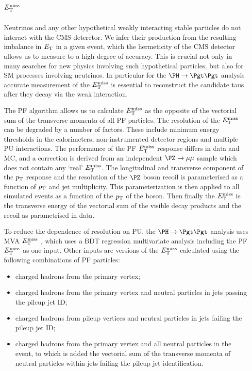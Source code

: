\section{$E_{\mathrm{T}}^{\text{miss}}$}
\label{sec:met}

Neutrinos and any other hypothetical weakly interacting stable particles do not
interact with the CMS deterctor. We infer their production from the resulting
imbalance in $E_{\mathrm{T}}$ in a given event, which the hermeticity of the CMS detector
allows us to measure to a high degree of accuracy. This is crucial not only in
many searches for new physics involving such hypothetical particles, but also for
\ac{SM} processes involving neutrinos. In particular for the $\PH \to \Pgt\Pgt$
analysis accurate measurement of the $E_{\mathrm{T}}^{\text{miss}}$ is essential to reconstruct the
candidate taus after they decay via the weak interaction.

The \ac{PF} algorithm allows us to calculate $E_{\mathrm{T}}^{\text{miss}}$ as the opposite of the vectorial sum
of the transverse momenta of all \ac{PF} particles. The resolution of the $E_{\mathrm{T}}^{\text{miss}}$
can be degraded by a number of factors. These include minimum energy thresholds
in the calorimeters, non-instrumented detector regions and multiple \ac{PU}
interactions. The performance of the \ac{PF} $E_{\mathrm{T}}^{\text{miss}}$ response differs in data and
MC, and a correction is derived from an independent $\PZ\to\mu\mu$ sample which
does not contain any `real' $E_{\mathrm{T}}^{\text{miss}}$. The longitudinal and transverse component of
the $p_{\mathrm{T}}$ response and the resolution of the $\PZ$ boson recoil is parameterised
as a function of $p_{\mathrm{T}}$ and jet multiplicity. This parameterization is then
applied to all simulated events as a function of the $p_{\mathrm{T}}$ of the boson. Then
finally the $E_{\mathrm{T}}^{\text{miss}}$ is the transverse energy of the vectorial sum of the visible
decay products and the recoil as parametrised in data. 

To reduce the dependence of resolution on \ac{PU}, the $\PH\to\Pgt\Pgt$
analysis uses MVA $E_{\mathrm{T}}^{\text{miss}}$ \cite{CMS-PAS-JME-12-002}, 
which uses a \ac{BDT} regression multivariate analysis
including the \ac{PF} $E_{\mathrm{T}}^{\text{miss}}$ as one input. Other inputs are versions of the
$E_{\mathrm{T}}^{\text{miss}}$ calculated using the following combinations of \ac{PF} particles: 
\begin{itemize}
\item charged hadrons from the primary vertex;
\item charged hadrons from the primary vertex and neutral particles in jets
passing the pileup jet ID;
\item charged hadrons from pileup vertices and neutral particles in jets failing
the pileup jet ID;
\item charged hadrons from the primary vertex and all neutral particles in the
event, to which is added the vectorial sum of the transverse momenta of neutral
particles within jets failing the pileup jet identification.
\end{itemize}

